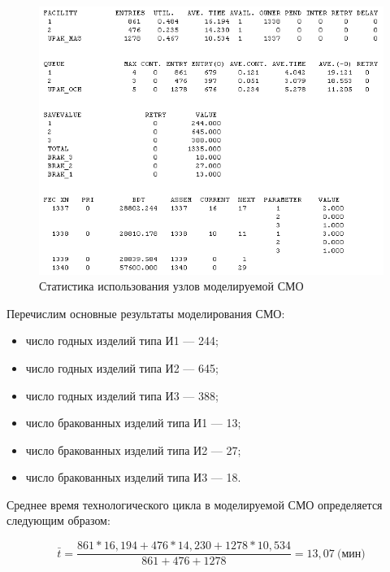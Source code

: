 \begin{figure}[h!]
  \centering
  \includegraphics[width=0.7\linewidth]{pic/report_3}
  \caption{Статистика использования узлов моделируемой СМО}
  \label{pic:report_3}
\end{figure}

Перечислим основные результаты моделирования СМО:

\begin{itemize}
\item число годных изделий типа И1 --- 244;
\item число годных изделий типа И2 --- 645;
\item число годных изделий типа И3 --- 388;
\item число бракованных изделий типа И1 --- 13;
\item число бракованных изделий типа И2 --- 27;
\item число бракованных изделий типа И3 --- 18.
\end{itemize}

Среднее время технологического цикла в моделируемой СМО определяется следующим образом:

\begin{equation*}
  \bar{t} = \dfrac{861 * 16{,}194 + 476 * 14{,}230 + 1278 * 10{,}534}{861 + 476 + 1278} = 13{,}07 \: \text{(мин)}
\end{equation*}

\newpage
